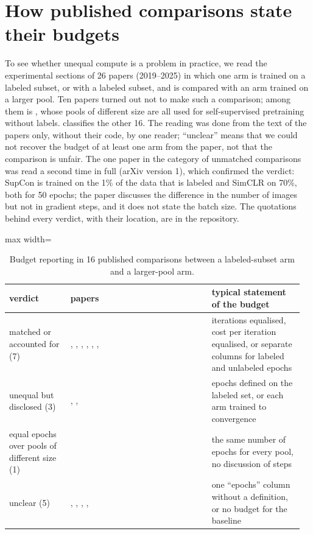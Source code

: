\section{How published comparisons state their budgets}
\label{app:audit}
To see whether unequal compute is a problem in practice, we read the experimental sections of 26 papers
(2019--2025) in which one arm is trained on a labeled subset, or with a labeled subset, and is compared with
an arm trained on a larger pool. Ten papers turned out not to make such a comparison; among them is
\citet{cole2022when}, whose pools of different size are all used for self-supervised pretraining without
labels.  classifies the other 16. The reading was done from the text of the papers only,
without their code, by one reader; ``unclear'' means that we could not recover the budget of at least one arm
from the paper, not that the comparison is unfair. The one paper in the category of unmatched comparisons
was read a second time in full (arXiv version 1), which confirmed the verdict: SupCon is trained on the 1\% of
the data that is labeled and SimCLR on 70\%, both for 50 epochs; the paper discusses the difference in the number
of images but not in gradient steps, and it does not state the batch size. The quotations behind every verdict,
with their location, are in the repository.

\begin{table}[h]
\centering
\small
\caption{Budget reporting in 16 published comparisons between a labeled-subset arm and a larger-pool arm.}
\label{tab:audit}
\begin{adjustbox}{max width=\linewidth}
\begin{tabular}{p{0.20\linewidth} p{0.46\linewidth} p{0.30\linewidth}}
\toprule
verdict & papers & typical statement of the budget \\
\midrule
matched or accounted for (7) &
\citet{assran2020suncet}, \citet{assran2021paws}, \citet{zheng2022simmatch}, \citet{fini2023semi},
\citet{newell2020useful}, \citet{liu2022self}, \citet{wang2022usb} &
iterations equalised, cost per iteration equalised, or separate columns for labeled and unlabeled epochs \\
\addlinespace
unequal but disclosed (3) &
\citet{zhai2019s4l}, \citet{Cai2022SemiViT}, \citet{zoph2020rethinking} &
epochs defined on the labeled set, or each arm trained to convergence \\
\addlinespace
equal epochs over pools of different size (1) &
\citet{Benato2023Linking} &
the same number of epochs for every pool, no discussion of steps \\
\addlinespace
unclear (5) &
\citet{chen2020simclrv2}, \citet{henaff2020data}, \citet{li2021comatch}, \citet{berthelot2019mixmatch},
\citet{Zhang2021CoCalibration} &
one ``epochs'' column without a definition, or no budget for the baseline \\
\bottomrule
\end{tabular}
\end{adjustbox}
\end{table}

